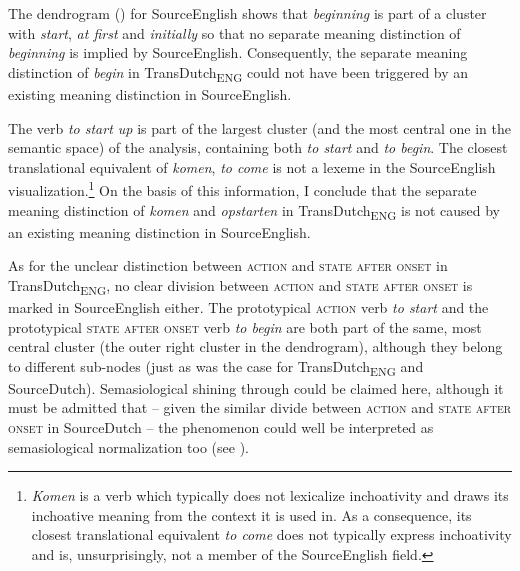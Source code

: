 The dendrogram () for SourceEnglish shows that \textit{beginning} is part of a cluster with \textit{start}, \textit{at first} and \textit{initially} so that no separate meaning distinction of \textit{beginning} is implied by SourceEnglish. Consequently, the separate meaning distinction of \textit{begin} in TransDutch\textsubscript{ENG} could not have been triggered by an existing meaning distinction in SourceEnglish.

The verb \textit{to start up} is part of the largest cluster (and the most central one in the semantic space) of the analysis, containing both \textit{to start} and \textit{to begin}. The closest translational equivalent of \textit{komen}, \textit{to come} is not a lexeme in the SourceEnglish visualization.\footnote{\textit{Komen} is a verb which typically does not lexicalize inchoativity and draws its inchoative meaning from the context it is used in. As a consequence, its closest translational equivalent \textit{to come} does not typically express inchoativity and is, unsurprisingly, not a member of the SourceEnglish field.} On the basis of this information, I conclude that the separate meaning distinction of \textit{komen} and \textit{opstarten} in TransDutch\textsubscript{ENG} is not caused by an existing meaning distinction in SourceEnglish.

As for the unclear distinction between \textsc{action} and \textsc{state after onset} in TransDutch\textsubscript{ENG}, no clear division between \textsc{action} and \textsc{state after onset} is marked in SourceEnglish either. The prototypical \textsc{action} verb \textit{to start} and the prototypical \textsc{state after onset} verb \textit{to begin} are both part of the same, most central cluster (the outer right cluster in the dendrogram), although they belong to different sub-nodes (just as was the case for TransDutch\textsubscript{ENG} and SourceDutch). Semasiological shining through could be claimed here, although it must be admitted that -- given the similar divide between \textsc{action} and \textsc{state after onset} in SourceDutch – the phenomenon could well be interpreted as semasiological normalization too (see ).

